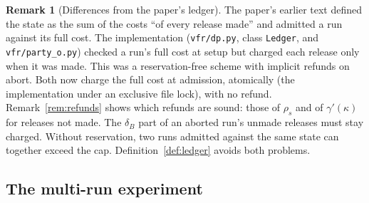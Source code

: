 \documentclass[11pt]{article}
\theoremstyle{definition}
\newtheorem{remark}[definition]{Remark}
\theoremstyle{plain}
\begin{document}
\begin{remark}[Differences from the paper's ledger]\label{rem:ledgerdiff}
The paper's earlier text defined the state as the sum of the costs ``of every release made'' and admitted a run against its full cost. The implementation (\texttt{vfr/dp.py}, class \texttt{Ledger}, and \texttt{vfr/party\_o.py}) checked a run's full cost at setup but charged each release only when it was made. This was a reservation-free scheme with implicit refunds on abort. Both now charge the full cost at admission, atomically (the implementation under an exclusive file lock), with no refund. Remark~\ref{rem:refunds} shows which refunds are sound: those of $\rho_s$ and of $\gamma'(\kappa)$ for releases not made. The $\delta_B$ part of an aborted run's unmade releases must stay charged. Without reservation, two runs admitted against the same state can together exceed the cap. Definition~\ref{def:ledger} avoids both problems.
\end{remark}

\subsection{The multi-run experiment}
\end{document}
